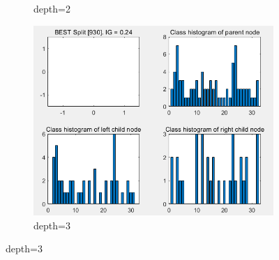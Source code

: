 \begin{figure}
\begin{subfigure}{0.33\linewidth}
		\caption{depth=2}
	\end{subfigure}
	\hfill
	\begin{subfigure}{0.33\linewidth}
		\centering
		\includegraphics[width=\linewidth]{image/q5-app/hist3.png}
		\caption{depth=3}
	\end{subfigure}
	

\end{figure}

